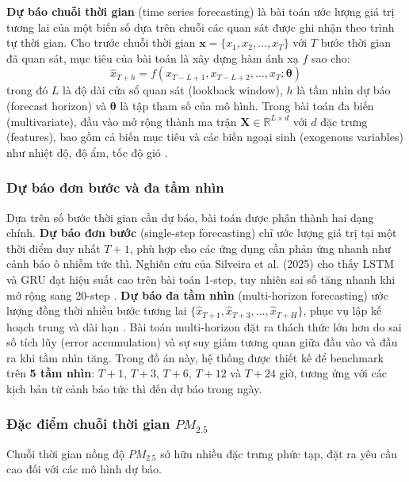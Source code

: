 \textbf{Dự báo chuỗi thời gian} (time series forecasting) là bài toán ước lượng giá trị tương lai của một biến số dựa trên chuỗi các quan sát được ghi nhận theo trình tự thời gian. Cho trước chuỗi thời gian $\mathbf{x} = \{x_1, x_2, \ldots, x_T\}$ với $T$ bước thời gian đã quan sát, mục tiêu của bài toán là xây dựng hàm ánh xạ $f$ sao cho:
\begin{equation}
    \hat{x}_{T+h} = f(x_{T-L+1}, x_{T-L+2}, \ldots, x_T; \boldsymbol{\theta})
\end{equation}
trong đó $L$ là độ dài cửa sổ quan sát (lookback window), $h$ là tầm nhìn dự báo (forecast horizon) và $\boldsymbol{\theta}$ là tập tham số của mô hình. Trong bài toán đa biến (multivariate), đầu vào mở rộng thành ma trận $\mathbf{X} \in \mathbb{R}^{L \times d}$ với $d$ đặc trưng (features), bao gồm cả biến mục tiêu và các biến ngoại sinh (exogenous variables) như nhiệt độ, độ ẩm, tốc độ gió \cite{Chen_2026, liu2024itransformer}.

\subsubsection{Dự báo đơn bước và đa tầm nhìn}

Dựa trên số bước thời gian cần dự báo, bài toán được phân thành hai dạng chính. \textbf{Dự báo đơn bước} (single-step forecasting) chỉ ước lượng giá trị tại một thời điểm duy nhất $T+1$, phù hợp cho các ứng dụng cần phản ứng nhanh như cảnh báo ô nhiễm tức thì. Nghiên cứu của Silveira et al. (2025) cho thấy LSTM và GRU đạt hiệu suất cao trên bài toán 1-step, tuy nhiên sai số tăng nhanh khi mở rộng sang 20-step \cite{silveira2025lstmgru}. \textbf{Dự báo đa tầm nhìn} (multi-horizon forecasting) ước lượng đồng thời nhiều bước tương lai $\{\hat{x}_{T+1}, \hat{x}_{T+3}, \ldots, \hat{x}_{T+H}\}$, phục vụ lập kế hoạch trung và dài hạn \cite{armstrong1992mape}. Bài toán multi-horizon đặt ra thách thức lớn hơn do sai số tích lũy (error accumulation) và sự suy giảm tương quan giữa đầu vào và đầu ra khi tầm nhìn tăng. Trong đồ án này, hệ thống được thiết kế để benchmark trên \textbf{5 tầm nhìn}: $T+1$, $T+3$, $T+6$, $T+12$ và $T+24$ giờ, tương ứng với các kịch bản từ cảnh báo tức thì đến dự báo trong ngày.

\subsubsection{Đặc điểm chuỗi thời gian $PM_{2.5}$}

Chuỗi thời gian nồng độ $PM_{2.5}$ sở hữu nhiều đặc trưng phức tạp, đặt ra yêu cầu cao đối với các mô hình dự báo.

